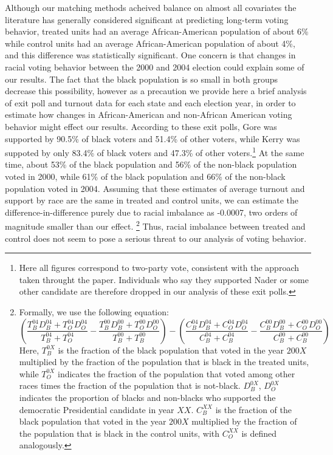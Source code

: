 Although our matching methods acheived balance on almost all covariates the literature has generally considered significant at predicting long-term voting behavior, treated units had an average African-American population of about 6\% while control units had an average African-American population of about 4\%, and this difference was statistically significant. One concern is that changes in racial voting behavior between the 2000 and 2004 election could explain some of our results. The fact that the black population is so small in both groups decrease this possibility, however as a precaution we provide here a brief analysis of exit poll and turnout data for each state and each election year, in order to estimate how changes in African-American and non-African American voting behavior might effect our results. According to these exit polls, Gore was supported by 90.5\% of black voters and 51.4\% of other voters, while Kerry was suppoted by only 83.4\% of black voters and 47.3\% of other voters.\footnote{Here all figures correspond to two-party vote, consistent with the approach taken throught  the paper. Individuals who say they supported Nader or some other candidate are therefore dropped in our analysis of these exit polls.}  At the same time, about 53\% of the black population and 56\% of the non-black population voted in 2000, while 61\% of the black population and 66\% of the non-black population voted in 2004. Assuming that these estimates of average turnout and support by race are the same in treated and control units, we can estimate the difference-in-difference purely due to racial imbalance as -0.0007, two orders of magnitude smaller than our effect. \footnote{Formally, we use the following equation: $$(\frac{ T_B^{04} D_B^{04} +  T_O^{04}  D_O^{04}}{ T_B^{04} +  T_O^{04}} - \frac{ T_B^{00} D_B^{00} +  T_O^{00}  D_O^{00}}{ T_B^{00} +  T_B^{00}}) - (\frac{ C_B^{04} D_B^{04} +  C_O^{04}  D_O^{04}}{ C_B^{04} +  C_B^{04}} - \frac{ C_B^{00} D_B^{00} +  C_O^{00}  D_O^{00}}{ C_B^{00} +  C_B^{00}}) $$ 
Here, $T_B^{0X}$ is the fraction of the black population that voted in the year $200X$ multiplied by the fraction of the population that is black in the treated units, while $T_O^{0X}$ indicates the fraction of the population that voted among other races times the fraction of the population that is not-black.  $D_B^{0X}$, $D_O^{0X}$ indicates the proportion of blacks and non-blacks who supported the democratic Presidential candidate in year $XX$. $C_B^{XX}$ is the fraction of the black population that voted in the year $200X$ multiplied by the fraction of the population that is black in the control units, with $C_O^{XX}$ is defined analogously.}  Thus, racial imbalance between treated and control does not seem to pose a serious threat to our analysis of voting behavior.

